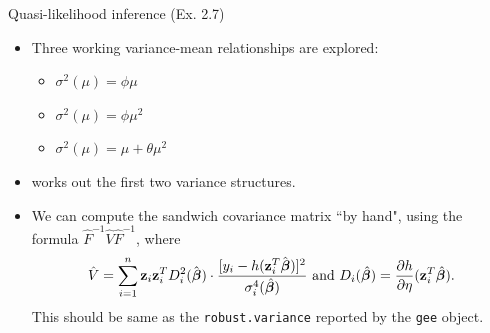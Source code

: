 \documentclass{beamer}
\newenvironment{wideitemize}%
  {\begin{itemize}%
    \setlength{\parskip}{1em}}%
  {\end{itemize}}
\begin{document}
\begin{frame}{Quasi-likelihood inference (Ex. 2.7)}
\begin{wideitemize}
\item  Three working variance-mean relationships are explored:
\begin{itemize}
\item $\sigma^2 (\mu) = \phi \mu$
\item $\sigma^2 (\mu) = \phi \mu^2$
\item $\sigma^2 (\mu)  = \mu + \theta \mu^2 $
\end{itemize}


\item {} works out the first two variance structures.

\item We can compute the sandwich covariance matrix ``by hand", using the formula $\hat{F}^{-1} \hat{V}\hat{F}^{-1}$, where
\[\hat{V}=\sum_{i=1}^n\textbf{z}_i\textbf{z}_i^T 
D_i^2(\hat{\mbox{\boldmath $\beta$}})\cdot\frac{[y_i-h(\textbf{z}_i^T\hat{\mbox{\boldmath $\beta$}})]^2}{
\sigma_i^4(\hat{\boldsymbol \beta})}\text{ and } D_i(\hat{\boldsymbol \beta}) = \frac{\partial h}{\partial \eta} ({\bf z}_i^T \hat{\boldsymbol \beta}).\]
This should be same as the \texttt{robust.variance} reported by the \texttt{gee} object.

\end{wideitemize}
\end{frame}



%
%
%
\end{document}
